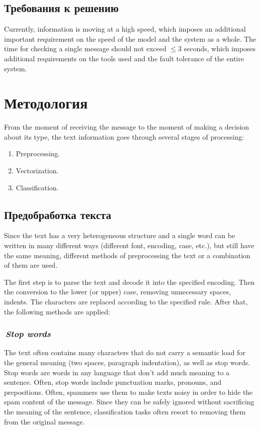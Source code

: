 \documentclass[12pt]{article}
\begin{document}
\subsection{Требования к решению}
Currently, information is moving at a high speed, which imposes an additional important requirement on the speed of the model and the system as a whole. The time for checking a single message should not exceed $\leqslant3$ seconds, which imposes additional requirements on the tools used and the fault tolerance of the entire system.

\section{Методология}

From the moment of receiving the message to the moment of making a decision about its type, the text information goes through several stages of processing:
\begin{enumerate}
\item Preprocessing.
\item Vectorization.
\item Classification.
\end{enumerate}

\subsection{Предобработка текста}
Since the text has a very heterogeneous structure and a single word can be written in many different ways (different font, encoding, case, etc.), but still have the same meaning, different methods of preprocessing the text or a combination of them are used.

The first step is to parse the text and decode it into the specified encoding. Then the conversion to the lower (or upper) case, removing unnecessary spaces, indents. The characters are replaced according to the specified rule. After that, the following methods are applied:

\subsubsection*{\it\,Stop words}
The text often contains many characters that do not carry a semantic load for the general meaning (two spaces, paragraph indentation), as well as stop words.
Stop words are words in any language that don't add much meaning to a sentence. Often, stop words include punctuation marks, pronouns, and prepositions. Often, spammers use them to make texts noisy in order to hide the spam content of the message. Since they can be safely ignored without sacrificing the meaning of the sentence, classification tasks often resort to removing them from the original message.
\end{document}
